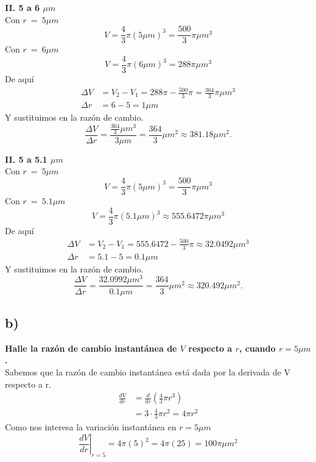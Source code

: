 \documentclass[11pt,letterpaper]{article}
\begin{document}
\textbf{II. 5 a 6 $\mu m$}\\
Con $r \ = \ 5\mu m$
\begin{equation*}
  V=\frac{4}{3}\pi (5\mu m)^3=\frac{500}{3}\pi\mu m ^3
\end{equation*}
Con $r \ = \ 6 \mu m $
\begin{equation*}
  V=\frac{4}{3}\pi (6\mu m)^3=288\pi\mu m ^3
\end{equation*}
De aquí
\begin{equation*}
  \begin{split}
    \Delta V &= V_2-V_1=288\pi-\frac{500}{3}\pi=\frac{364}{3}\pi \mu m^3 \\
    \Delta r &= 6-5 = 1 \mu m
  \end{split}
\end{equation*}
Y sustituimos en la razón de cambio.
\begin{equation*}
  \frac{\Delta V}{\Delta r}=\frac{\frac{364}{3}\mu m^3}{3 \mu m}=\frac{364}{3}\mu m^2\approx 381.18 \mu m^2.
\end{equation*}

\textbf{II. 5 a 5.1 $\mu m$}\\
Con $r \ = \ 5\mu m$
\begin{equation*}
  V=\frac{4}{3}\pi (5\mu m)^3=\frac{500}{3}\pi\mu m ^3
\end{equation*}
Con $r \ = \ 5.1 \mu m $
\begin{equation*}
  V=\frac{4}{3}\pi (5.1\mu m)^3 \approx 555.6472\pi\mu m ^3
\end{equation*}
De aquí
\begin{equation*}
  \begin{split}
    \Delta V &= V_2-V_1=555.6472-\frac{500}{3}\pi\approx 32.0492 \mu m^3 \\
    \Delta r &= 5.1-5 = 0.1 \mu m
  \end{split}
\end{equation*}
Y sustituimos en la razón de cambio.
\begin{equation*}
  \frac{\Delta V}{\Delta r}=\frac{32.0992 \mu m^3}{0.1 \mu m}=\frac{364}{3}\mu m^2\approx 320.492 \mu m^2.
\end{equation*}

\subsection*{b)}
\textbf{Halle la razón de cambio instantánea de $V$ respecto a $r$, cuando $r=5\mu m$.}\\
Sabemos que la razón de cambio instantánea está dada por la derivada de V respecto a r.
\begin{equation*}
  \begin{split}
    \frac{dV}{dr}&=\frac{d}{dr}\left(\frac{4}{3}\pi r^3\right) \\
    &= 3\cdot\frac{4}{3}\pi r^2 = 4\pi r^2
  \end{split}
\end{equation*}
Como nos interesa la variación instantánea en $r=5\mu m$
\begin{equation*}
  \left.\frac{dV}{dr}\right|_{r=5}=4\pi(5)^2=4\pi(25)=100\pi\mu m^2
\end{equation*}
\end{document}
